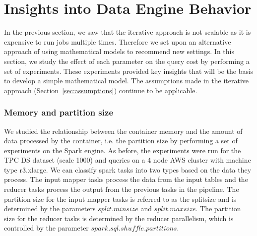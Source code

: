 \section{Insights into Data Engine Behavior}
\label{sec:insights}
In the previous section, we saw that the iterative approach is not scalable as it is expensive to run jobs multiple times. Therefore we set upon an alternative approach of using mathematical models to recommend new settings. In this section, we study the effect of each parameter on the query cost by performing a set of experiments. These experiments provided key insights that will be the basis to develop a simple mathematical model. 
The assumptions made in the iterative approach (Section~\ref{sec:assumptions}) continue to be applicable. 



\subsubsection*{Memory and partition size}
We studied the relationship between the container memory and the amount of data processed by the container, i.e. the partition size by performing a set of experiments on the Spark engine. As before, the experiments were run for the TPC DS dataset (scale 1000) and queries on a 4 node AWS cluster with machine type r3.xlarge. We can classify spark tasks into two types based on the data they process. The input mapper tasks process the data from the input tables and the reducer tasks process the output from the previous tasks in the pipeline. The partition size for the input mapper tasks is referred to as the splitsize and is determined by the parameters %
$split.minsize$ and %
$split.maxsize$. The partition size for the reducer tasks is determined by the reducer parallelism, which is controlled by the parameter $spark.sql.shuffle.partitions$. 

